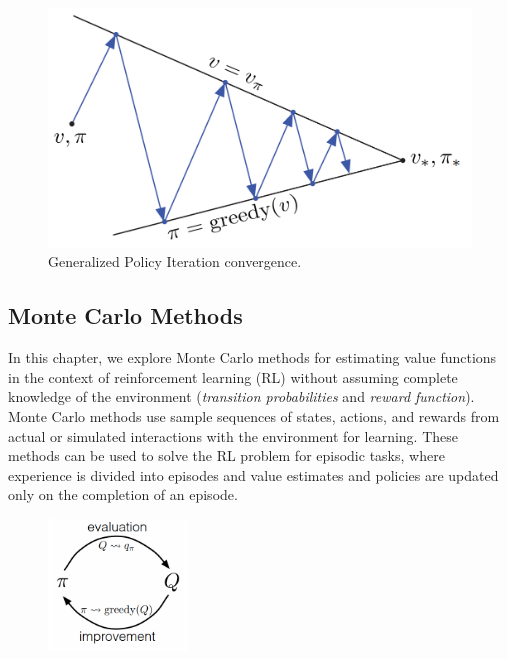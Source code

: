 \documentclass[../xlapes02]{subfiles}
\begin{document}
    \begin{figure}[h!]
        \centering
        \begin{minipage}[b]{0.5\textwidth}
            \includegraphics[width=\textwidth]{image/gpi2}
            \caption{Generalized Policy Iteration convergence.}
            \label{fig:gpi}
        \end{minipage}
    \end{figure}

    \subsection{Monte Carlo Methods}\label{subsec:monte-carlo-methods}
    In this chapter, we explore Monte Carlo methods for estimating value functions in the context of reinforcement learning (RL) without assuming complete knowledge of the environment (\emph{transition probabilities} and \emph{reward function}). Monte Carlo methods use sample sequences of states, actions, and rewards from actual or simulated interactions with the environment for learning. These methods can be used to solve the RL problem for episodic tasks, where experience is divided into episodes and value estimates and policies are updated only on the completion of an episode.

    \begin{figure}
        \begin{center}
            \includegraphics[width=0.33\textwidth]{image/mc-evaluation-improvement}
        \end{center}
    \end{figure}
\end{document}
